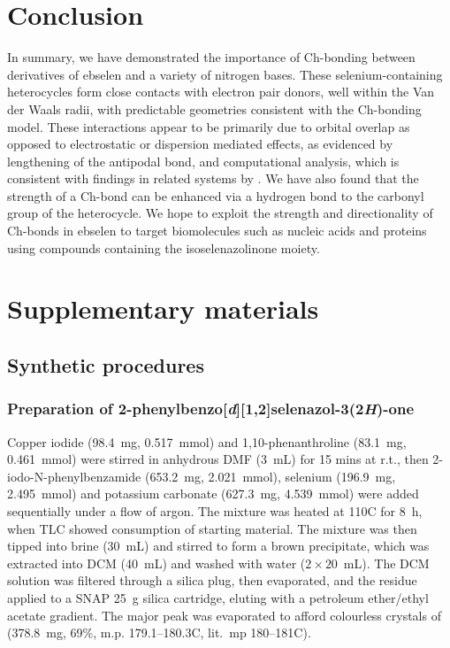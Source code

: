 \begin{refsection}
    \section{Conclusion}
    In summary, we have demonstrated the importance of Ch-bonding between derivatives of ebselen  and a variety of nitrogen bases.
    These selenium-containing heterocycles form close contacts with electron pair donors, well within the Van der Waals radii, with predictable geometries consistent with the Ch-bonding model.
    These interactions appear to be primarily due to orbital overlap as opposed to electrostatic or dispersion mediated effects, as evidenced by lengthening of the antipodal  bond, and computational analysis, which is consistent with findings in related systems by \citeauthor{Pascoe2017}.\autocite{Pascoe2017}
    We have also found that the strength of a Ch-bond can be enhanced via a hydrogen bond to the carbonyl group of the heterocycle.
    We hope to exploit the strength and directionality of Ch-bonds in ebselen to target biomolecules such as nucleic acids and proteins using compounds containing the isoselenazolinone moiety.
    
    \section{Supplementary materials}
    
    \subsection{Synthetic procedures}
    
    \subsubsection[Preparation of \refcmpd{ebs}]{Preparation of 2-phenylbenzo[\textit{d}][1,2]selenazol-3(2\textit{H})-one }
    
    Copper iodide (98.4~mg, 0.517~mmol) and 1,10-phenanthroline (83.1~mg, 0.461~mmol) were stirred in anhydrous DMF (3~mL) for 15 mins at r.t., then 2-iodo-N-phenylbenz\-amide (653.2~mg, 2.021~mmol), selenium (196.9~mg, 2.495~mmol) and potassium carbonate (627.3~mg, 4.539~mmol) were added sequentially under a flow of argon.
    The mixture was heated at 110\degree{}C for 8~h, when TLC showed consumption of starting material.
    The mixture was then tipped into brine (30~mL) and stirred to form a brown precipitate, which was extracted into DCM (40~mL) and washed with water ($ 2 \times 20 $~mL).
    The DCM solution was filtered through a silica plug, then evaporated, and the residue applied to a SNAP 25~g silica cartridge, eluting with a petroleum ether/ethyl acetate gradient.
    The major peak was evaporated to afford colourless crystals of  (378.8~mg, 69\%, m.p. 179.1--180.3\degree{}C, lit.\ mp 180--181\degree{}C). 
    

\end{refsection}
